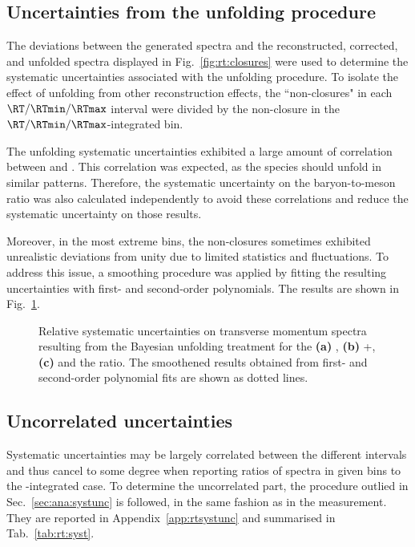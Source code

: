 \subsection{Uncertainties from the unfolding procedure}

The deviations between the generated \pt spectra and the reconstructed, corrected, and unfolded \pt spectra displayed in Fig.~\ref{fig:rt:closures} were used to determine the systematic uncertainties associated with the unfolding procedure. To isolate the effect of unfolding from other reconstruction effects, the ``non-closures" in each $\RT/\RTmin/\RTmax$ interval were divided by the non-closure in the $\RT/\RTmin/\RTmax$-integrated bin.

The unfolding systematic uncertainties exhibited a large amount of correlation between \KOs and \LA. This correlation was expected, as the \VO species should unfold in similar patterns. Therefore, the systematic uncertainty on the baryon-to-meson ratio was also calculated independently to avoid these correlations and reduce the systematic uncertainty on those results.

Moreover, in the most extreme bins, the non-closures sometimes exhibited unrealistic deviations from unity due to limited statistics and fluctuations. To address this issue, a smoothing procedure was applied by fitting the resulting uncertainties with first- and second-order polynomials. The results are shown in Fig.~\ref{fig:rt:systUnf}.

\begin{figure}[H]%
\caption{Relative systematic uncertainties on transverse momentum spectra resulting from the Bayesian unfolding treatment for the \textbf{(a)} \KOs, \textbf{(b)} \LA+\AL, \textbf{(c)} and the \ltok ratio. The smoothened results obtained from first- and second-order polynomial fits are shown as dotted lines.}
\label{fig:rt:systUnf}
\end{figure}

\subsection{Uncorrelated uncertainties}

Systematic uncertainties may be largely correlated between the different \RT intervals and thus cancel to some degree when reporting ratios of \pt spectra in given \RT bins to the \RT-integrated case. To determine the uncorrelated part, the procedure outlied in Sec.~\ref{sec:ana:systunc} is followed, in the same fashion as in the \SOPT measurement. They are reported in Appendix~\ref{app:rtsystunc} and summarised in Tab.~\ref{tab:rt:syst}.

